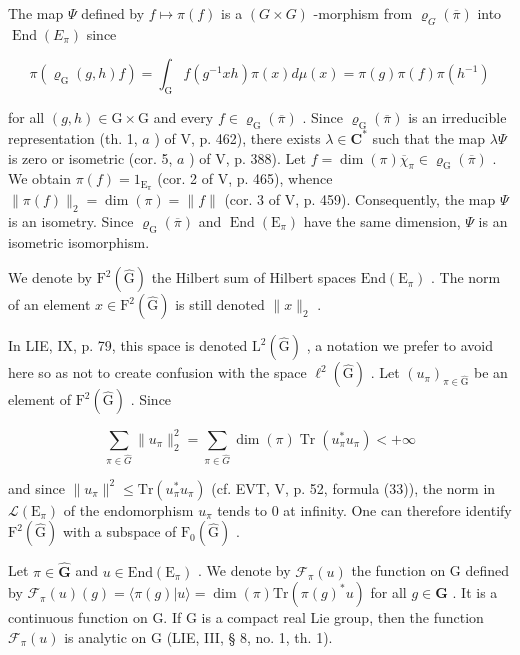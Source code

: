 The map \(\Psi\) defined by \(f\mapsto\pi(f)\) is a \((G\times G)\) -morphism from \(\varrho_{G}(\overline{\pi})\) into \(\operatorname{End}(E_{\pi})\) since

\[
\pi (\varrho_ {\mathrm{G}} (g, h) f) = \int_ {\mathrm{G}} f (g ^ {- 1} x h) \pi (x) d \mu (x) = \pi (g) \pi (f) \pi (h ^ {- 1})
\]

for all \((g,h)\in\mathrm{G}\times\mathrm{G}\) and every \(f\in\varrho_{\mathrm{G}}(\overline{\pi})\) . Since \(\varrho_{\mathrm{G}}(\overline{\pi})\) is an irreducible representation (th. 1, \(a\) ) of V, p. 462), there exists \(\lambda\in\mathbf{C}^{*}\) such that the map \(\lambda\Psi\) is zero or isometric (cor. 5, \(a\) ) of V, p. 388). Let \(f=\dim(\pi)\overline{\chi}_{\pi}\in\varrho_{\mathrm{G}}(\overline{\pi})\) . We obtain \(\pi(f)=1_{\mathrm{E}_{\pi}}\) (cor. 2 of V, p. 465), whence \(\|\pi(f)\|_{2}=\dim(\pi)=\|f\|\) (cor. 3 of V, p. 459). Consequently, the map \(\Psi\) is an isometry. Since \(\varrho_{\mathrm{G}}(\overline{\pi})\) and \(\operatorname{End}(\mathrm{E}_{\pi})\) have the same dimension, \(\Psi\) is an isometric isomorphism.

We denote by \(\mathrm{F}^{2}(\widehat{\mathrm{G}})\) the Hilbert sum of Hilbert spaces \(\mathrm{End}(\mathrm{E}_{\pi})\) . The norm of an element \(x \in \mathrm{F}^{2}(\widehat{\mathrm{G}})\) is still denoted \(\|x\|_{2}\) .

In LIE, IX, p. 79, this space is denoted \(\mathrm{L}^{2}(\widehat{\mathrm{G}})\) , a notation we prefer to avoid here so as not to create confusion with the space \(\ell^{2}(\widehat{\mathrm{G}})\) . Let \((u_{\pi})_{\pi\in\widehat{\mathrm{G}}}\) be an element of \(\mathrm{F}^{2}(\widehat{\mathrm{G}})\) . Since

\[
\sum_ {\pi \in \widehat {G}} \| u _ {\pi} \| _ {2} ^ {2} = \sum_ {\pi \in \widehat {G}} \dim (\pi) \operatorname{Tr} (u _ {\pi} ^ {*} u _ {\pi}) <   + \infty
\]

and since \(\|u_{\pi}\|^{2}\leqslant\mathrm{Tr}(u_{\pi}^{*}u_{\pi})\) (cf. EVT, V, p. 52, formula (33)), the norm in \(\mathcal{L}(\mathrm{E}_{\pi})\) of the endomorphism \(u_{\pi}\) tends to 0 at infinity. One can therefore identify \(\mathrm{F}^{2}(\widehat{\mathrm{G}})\) with a subspace of \(\mathrm{F}_{0}(\widehat{\mathrm{G}})\) .

Let \(\pi \in \widehat{\mathbf{G}}\) and \(u \in \mathrm{End}(\mathrm{E}_{\pi})\) . We denote by \(\mathcal{F}_{\pi}(u)\) the function on G defined by \(\mathcal{F}_{\pi}(u)(g) = \langle \pi(g) | u \rangle = \dim(\pi) \mathrm{Tr}(\pi(g)^{*} u)\) for all \(g \in \mathbf{G}\) . It is a continuous function on G. If G is a compact real Lie group, then the function \(\mathcal{F}_{\pi}(u)\) is analytic on G (LIE, III, § 8, no. 1, th. 1).

